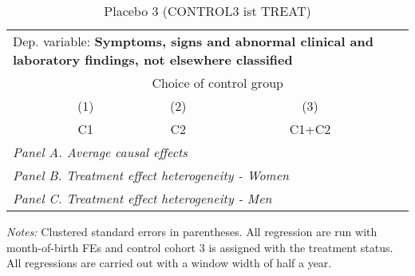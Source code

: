  \begin{table}[H] \centering \begin{threeparttable} \caption{Placebo 3 (CONTROL3 ist TREAT) } {\def\sym#1{\ifmmode^{#1}\else\(^{#1}\)\fi} \begin{tabular}{l*{4}{c}} \toprule \multicolumn{4}{l}{Dep. variable: \textbf{Symptoms, signs and abnormal clinical and laboratory findings, not elsewhere classified}} \\ & \multicolumn{3}{c}{Choice of control group} \\ \cmidrule(lr){2-4}
            &\multicolumn{1}{c}{(1)}&\multicolumn{1}{c}{(2)}&\multicolumn{1}{c}{(3)}\\
            &\multicolumn{1}{c}{C1}&\multicolumn{1}{c}{C2}&\multicolumn{1}{c}{C1+C2}\\
\midrule
 \multicolumn{4}{l}{\emph{Panel A. Average causal effects}} \\      \midrule\multicolumn{4}{l}{\emph{Panel B. Treatment effect heterogeneity - Women}} \\      \midrule\multicolumn{4}{l}{\emph{Panel C. Treatment effect heterogeneity - Men}} \\      
\bottomrule \end{tabular} } \begin{tablenotes} \item \scriptsize \emph{Notes:} Clustered standard errors in parentheses. All regression are run with month-of-birth FEs and control cohort 3 is assigned with the treatment status. All regressions are carried out with a window width of half a year. \end{tablenotes} \end{threeparttable} \end{table} 
